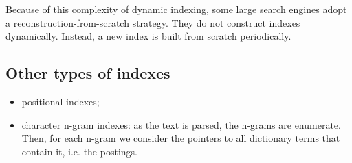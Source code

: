Because of this complexity of dynamic indexing, some large search engines adopt a reconstruction-from-scratch strategy. They do not construct indexes dynamically. Instead, a new index is built from scratch periodically.

\subsection{Other types of indexes}

\begin{itemize}
    \item positional indexes;
    \item character n-gram indexes: as the text is parsed, the n-grams are enumerate. Then, for each n-gram we consider the pointers to all dictionary terms that contain it, i.e. the postings.
\end{itemize}
